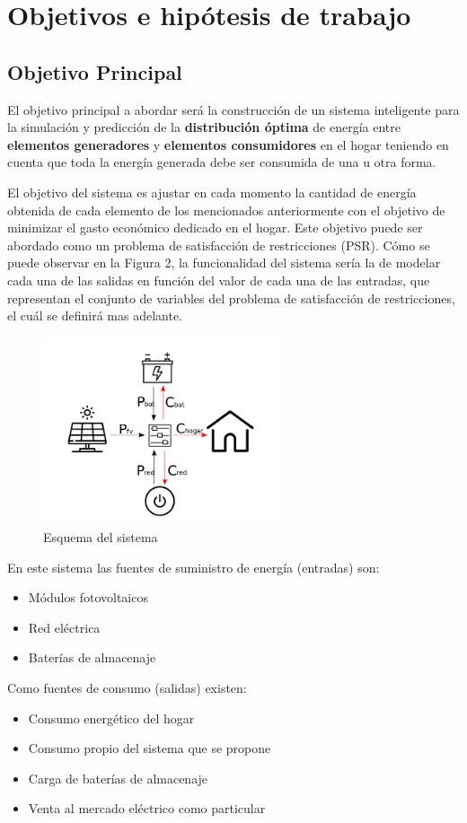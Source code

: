 \chapter{Objetivos e hipótesis de trabajo}
\label{cap:Objetivo}


\section{Objetivo Principal}
El objetivo principal a abordar será la construcción de un sistema inteligente para la simulación y predicción de la \textbf{distribución óptima} de energía entre \textbf{elementos generadores} y \textbf{elementos consumidores} en el hogar teniendo en cuenta que toda la energía generada debe ser consumida de una u otra forma.

El objetivo del sistema es ajustar en cada momento la cantidad de energía obtenida de cada elemento de los mencionados anteriormente con el objetivo de minimizar el gasto económico dedicado en el hogar.
Este objetivo puede ser abordado como un problema de satisfacción de restricciones (PSR).
Cómo se puede observar en la Figura 2, la funcionalidad del sistema sería la de modelar cada una de las salidas en función del valor de cada una de las entradas, que representan el conjunto de variables del problema de satisfacción de restricciones, el cuál se definirá mas adelante.

\begin{figure}[!h]
	\centering
	\includegraphics[width=7cm]{figs/Esquema.png}
	\caption{Esquema del sistema}
\end{figure}

En este sistema las fuentes de suministro de energía (entradas) son:
\begin{itemize}
	\item Módulos fotovoltaicos
	\item Red eléctrica
	\item Baterías de almacenaje
\end{itemize}
Como fuentes de consumo (salidas) existen:
\begin{itemize}
	\item Consumo energético del hogar
	\item Consumo propio del sistema que se propone
	\item Carga de baterías de almacenaje
	\item Venta al mercado eléctrico como particular
\end{itemize}

